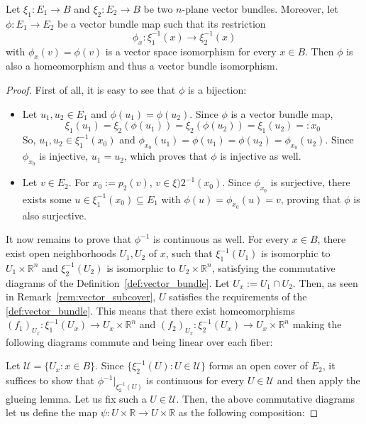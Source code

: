 \begin{proposition}\label{prop:local_to_global_iso_vector} Let $\xi_1:E_1\to B$ and $\xi_2:E_2\to B$ be two $n$-plane vector bundles. Moreover, let $\phi:E_1\to E_2$ be a vector bundle map such that its restriction
\[\phi_x:\xi_1^{-1}(x)\to\xi_2^{-1}(x)\]
with $\phi_x(v)=\phi(v)$ is a vector space isomorphism for every $x\in B$. Then $\phi$ is also a homeomorphism and thus a vector bundle isomorphism.
\end{proposition}
\begin{proof} First of all, it is easy to see that $\phi$ is a bijection:
\begin{itemize}
\item Let $u_1,u_2\in E_1$ and $\phi(u_1)=\phi(u_2)$. Since $\phi$ is a vector bundle map, 
\[\xi_1(u_1)=\xi_2(\phi(u_1))=\xi_2(\phi(u_2))=\xi_1(u_2)=:x_0\]
So, $u_1,u_2\in\xi_1^{-1}(x_0)$ and $\phi_{x_0}(u_1)=\phi(u_1)=\phi(u_2)=\phi_{x_0}(u_2)$. Since $\phi_{x_0}$ is injective, $u_1=u_2$, which proves that $\phi$ is injective as well.
\item Let $v\in E_2$. For $x_0:=p_2(v)$, $v\in\xi)2^{-1}(x_0)$. Since $\phi_{x_0}$ is surjective, there exists some $u\in\xi_1^{-1}(x_0)\subseteq E_1$ with $\phi(u)=\phi_{x_0}(u)=v$, proving that $\phi$ is also surjective.
\end{itemize}
It now remains to prove that $\phi^{-1}$ is continuous as well. For every $x\in B$, there exist open neighborhoods $U_1,U_2$ of $x$, such that $\xi_1^{-1}(U_1)$ is isomorphic to $U_1\times\mathbb{R}^n$ and $\xi_2^{-1}(U_2)$ is isomorphic to $U_2\times\mathbb{R}^n$, satisfying the commutative diagrams of the Definition~\ref{def:vector_bundle}. Let $U_x:=U_1\cap U_2$. Then, as seen in Remark~\ref{rem:vector_subcover}, $U$ satisfies the requirements of the \ref{def:vector_bundle}. This means that there exist homeomorphisms $(f_1)_{U_x}:\xi_1^{-1}(U_x)\to U_x\times\mathbb{R}^n$ and $(f_2)_{U_x}:\xi_2^{-1}(U_x)\to U_x\times\mathbb{R}^n$ making the following diagrams commute and being linear over each fiber:
\begin{center}
\end{center}
Let $\mathcal{U}=\{U_x:x\in B\}$. Since $\{\xi_2^{-1}(U):U\in\mathcal{U}\}$ forms an open cover of $E_2$, it suffices to show that $\phi^{-1}|_{\xi_2^{-1}(U)}$ is continuous for every $U\in\mathcal{U}$ and then apply the glueing lemma. Let us fix such a $U\in\mathcal{U}$. Then, the above commutative diagrams let us define the map $\psi:U\times\mathbb{R}\to U\times\mathbb{R}$ as the following composition:

\end{proof}
